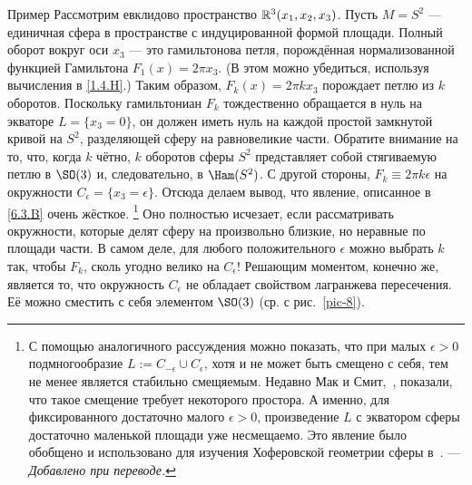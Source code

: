 \begin{ex}{Пример}\label{6.3.C}
Рассмотрим евклидово пространство $\mathbb{R}^3 (x_1, x_2, x_3)$.
Пусть $M = S^2$ — единичная сфера в пространстве с
индуцированной формой площади. 
Полный оборот вокруг оси $x_3$ — это гамильтонова петля, порождённая
нормализованной функцией Гамильтона $F_1 (x) = 2\pi x_3$. 
(В этом можно убедиться, используя вычисления в \ref{1.4.H}.)
Таким образом, $F_k (x) = 2\pi k x_3$ порождает петлю из $k$ оборотов.
Поскольку гамильтониан $F_k$ тождественно обращается в нуль на экваторе $L = \{x_3
= 0\}$, он должен иметь нуль на каждой простой
замкнутой кривой на $S^2$, разделяющей сферу на равновеликие части. 
Обратите внимание на то, что, когда $k$ чётно, $k$ оборотов сферы
$S^2$ представляет собой стягиваемую петлю в $\SO (3)$ и,
следовательно, в $\Ham (S^2)$. 
С другой стороны, $F_k \equiv 2\pi k\epsilon$ на окружности
$C_\epsilon = \{x_3 = \epsilon\}$. 
Отсюда делаем вывод, что явление, описанное в \ref{6.3.B} очень
жёсткое.%
\footnote{
  С помощью аналогичного рассуждения можно показать, что при малых
  $\epsilon > 0$ подмногообразие $L:=C_{-\epsilon}\cup C_{\epsilon}$,
  хотя и не может быть смещено с себя, тем не менее является стабильно
  смещяемым.
  Недавно Мак и Смит,~\cite{MS}, показали, что такое смещение требует
  некоторого простора. А именно, для фиксированного достаточно малого
  $\epsilon>0$, произведение $L$ с экватором сферы достаточно
  маленькой площади уже несмещаемо. Это явление было обобщено и
  использовано для изучения Хоферовской геометрии сферы в~\cite{PS21}. 
  --- \textit{Добавлено при переводе.}}
Оно полностью исчезает, если рассматривать окружности, которые делят
сферу на произвольно близкие, но неравные по площади части. 
В самом деле, для любого положительного $\epsilon$ можно выбрать $k$ так,
чтобы $F_k$, сколь угодно велико на $C_\epsilon$!
Решающим моментом, конечно же, является то, что окружность
$C_\epsilon$ не обладает свойством лагранжева пересечения. 
Её можно сместить с себя элементом $\SO (3)$ (ср. с рис.~\ref{pic-8}). 
\end{ex}
